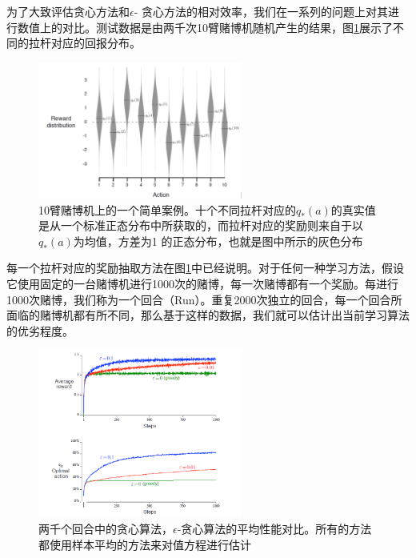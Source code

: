 \documentclass{ctexart}
\begin{document}
            为了大致评估贪心方法和$\epsilon$- 贪心方法的相对效率，我们在一系列的问题上对其进行数值上的对比。测试数据是由两千次10臂赌博机随机产生的结果，图\ref{f2_1}展示了不同的拉杆对应的回报分布。
            \begin{figure}
                \centering
                \includegraphics[width=0.6\textwidth]{f2-1}
                \caption{10臂赌博机上的一个简单案例。十个不同拉杆对应的$q_*(a)$的真实值是从一个标准正态分布中所获取的，而拉杆对应的奖励则来自于以$q_*(a)$为均值，方差为1 的正态分布，也就是图中所示的灰色分布}
                \label{f2_1}
            \end{figure}
            每一个拉杆对应的奖励抽取方法在图\ref{f2_1}中已经说明。对于任何一种学习方法，假设它使用固定的一台赌博机进行1000次的赌博，每一次赌博都有一个奖励。每进行1000次赌博，我们称为一个回合（Run）。重复2000次独立的回合，每一个回合所面临的赌博机都有所不同，那么基于这样的数据，我们就可以估计出当前学习算法的优劣程度。
            \begin{figure}
                \centering
                \includegraphics[width=0.6\textwidth]{f2-2}
                \caption{两千个回合中的贪心算法，$\epsilon$-贪心算法的平均性能对比。所有的方法都使用样本平均的方法来对值方程进行估计}
                \label{f2_2}
            \end{figure}
\end{document}

